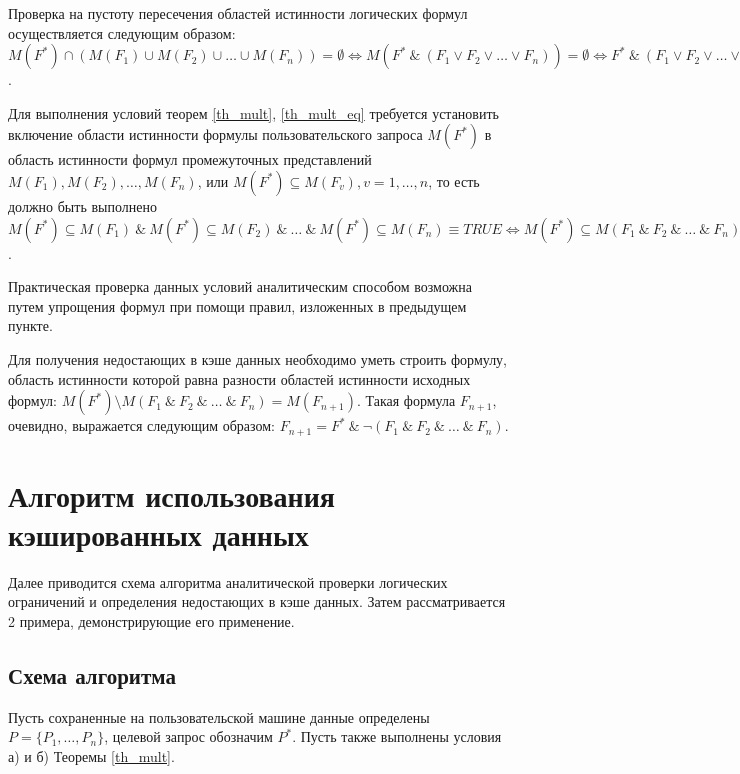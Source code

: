 \documentclass{cmi}
\def \n #1{\mathit{#1}}
\begin{document}
Проверка на пустоту пересечения областей истинности логических формул осуществляется следующим образом: $M(F^{\ast}) \cap (M(F_1) \cup M(F_2) \cup \dots \cup M(F_n)) = \emptyset \iff M(F^{\ast}\ \&\ (F_1 \vee F_2 \vee \dots \vee F_n)) = \emptyset \iff
F^{\ast}\ \&\ (F_1 \vee F_2 \vee \dots \vee F_n) \equiv \n{FALSE}$.

Для выполнения условий теорем \ref{th_mult}, \ref{th_mult_eq} требуется установить включение области
истинности формулы пользовательского запроса $M(F^{\ast})$ в область истинности формул промежуточных представлений $M(F_1), M(F_2), \dots, M(F_n)$, или $M(F^{\ast}) \subseteq M(F_{v}),
v = 1,\dots, n$, то есть должно быть выполнено $M(F^{\ast}) \subseteq M(F_1)\ \&\ M(F^{\ast}) \subseteq M(F_2)\ \&\ \dots\ \&\ M(F^{\ast}) \subseteq M(F_n) \equiv \n{TRUE} \iff M(F^{\ast}) \subseteq M(F_1\ \&\ F_2\ \&\ \dots\ \&\ F_n) \equiv \n{TRUE} \iff F^{\ast} \rightarrow F_1\ \&\ F_2\ \&\ \dots\ \&\ F_n \equiv \n{TRUE} \iff F_1\ \&\ F_2\ \&\ \dots \&\ F_n \vee \neg F^{\ast} \equiv \n{TRUE} $.

Практическая проверка данных условий аналитическим способом возможна путем упрощения формул при
помощи правил, изложенных в предыдущем пункте.

Для получения недостающих в кэше данных необходимо уметь строить формулу, область истинности которой
равна разности областей истинности исходных формул:
$M(F^{\ast}) \setminus M(F_1\ \&\ F_2\ \&\ \dots\ \&\ F_n) = M(F_{n + 1})$.
Такая формула $F_{n + 1}$, очевидно, выражается следующим образом: $F_{n + 1} = F^{\ast}\ \&\ \neg(F_1\ \&\ F_2\ \&\ \dots\ \&\ F_n)$.


\section{Алгоритм использования кэшированных данных}
\label{sec-algorithm}
Далее приводится схема алгоритма аналитической проверки логических ограничений и определения
недостающих в кэше данных. Затем рассматривается 2 примера, демонстрирующие его применение.

\subsection{Схема алгоритма}
Пусть сохраненные на пользовательской машине данные определены $P = \{P_1,
\dots, P_n\}$, целевой запрос обозначим $P^{\ast}$. Пусть также выполнены условия а) и б) Теоремы \ref{th_mult}.
\end{document}
